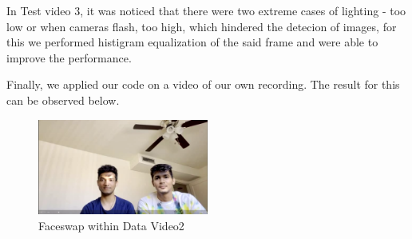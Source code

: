 \documentclass[conference]{IEEEtran}
\begin{document}
In Test video 3, it was noticed that there were two extreme cases of lighting - too low or when cameras flash, too high, which hindered the detecion of images, for this we performed histigram equalization of the said frame and were able to improve the performance.

Finally, we applied our code on a video of our own recording. The result for this can be observed below.

\begin{figure}[H]
\includegraphics[width=0.5\textwidth]{palande.png}
\centering
\caption{Faceswap within Data Video2}
\end{figure}

\begin{thebibliography}{1}


\end{thebibliography}
\end{document}
